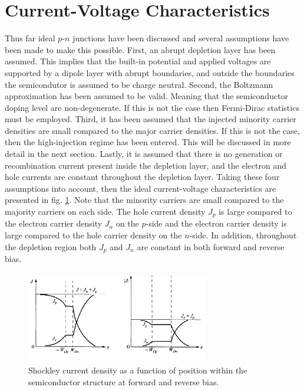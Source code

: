 \section{Current-Voltage Characteristics}\label{sec:cv_ideal}
Thus far ideal $p$-$n$ junctions have been discussed and several assumptions have been made to make 
this possible. First, an abrupt depletion layer has been assumed. This implies that the built-in potential
and applied voltages are supported by a dipole layer with abrupt boundaries, and outside the boundaries the semicondutor is assumed 
to be charge neutral. Second, the Boltzmann approximation has been assumed to be valid. Meaning that the semiconductor
doping level are non-degenerate. If this is not the case then Fermi-Dirac statistics must be employed. 
Third, it has been assumed that the injected minority carrier densities are small compared to the major carrier
densities. If this is not the case, then the high-injection regime has been entered. This will be discussed in more detail in the next section.
Lastly, it is assumed that there is no generation or recombination current present inside the depletion layer,
and the electron and hole currents are constant throughout the depletion layer. Taking these four assumptions into 
account, then the ideal current-voltage characteristics are presented in fig. \ref{fig:fig07}. Note that the minority carriers
are small compared to the majority carriers on each side. The hole current density $J_p$ is large compared to the electron 
carrier density $J_n$ on the $p$-side and the electron carrier density is large compared to the hole carrier density on the $n$-side. In addition,
throughout the depletion region both $J_p$ and $J_n$ are constant in both forward and reverse bias.
\begin{figure}[h!]\label{fig:fig07}
    \centering
    \includegraphics[height=4cm,width=8cm]{figs/schokley_current_reverse_forward}
    \caption{Shockley current density as a function of position within the semiconductor structure at forward and reverse bias.}
\end{figure}

